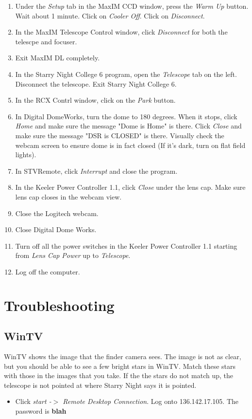 \documentclass[11pt]{report}
\begin{document}
\begin{enumerate}
\item Under the \emph{Setup} tab in the MaxIM CCD window, press the \emph{Warm Up} button. Wait about 1 minute. Click on \emph{Cooler Off}. Click on \emph{Disconnect}.
\item In the MaxIM Telescope Control window, click \emph{Disconnect} for both the telescpe and focuser.
\item Exit MaxIM DL completely.
\item In the Starry Night College 6 program, open the \emph{Telescope} tab on the left. Disconnect the telescope. Exit Starry Night College 6.
\item In the RCX Contrl window, click on the \emph{Park} button.
\item In Digital DomeWorks, turn the dome to 180 degrees. When it stops, click \emph{Home} and make sure the message "Dome is Home" is there. Click \emph{Close} and make sure the message "DSR is CLOSED" is there. Visually check the webcam screen to ensure dome is in fact closed (If it's dark, turn on flat field lights).
\item In STVRemote, click \emph{Interrupt} and close the program.
\item In the Keeler Power Controller 1.1, click \emph{Close} under the lens cap. Make sure lens cap closes in the webcam view.
\item Close the Logitech webcam.
\item Close Digital Dome Works.
\item Turn off all the power switches in the Keeler Power Controller 1.1 starting from \emph{Lens Cap Power} up to \emph{Telescope}.
\item Log off the computer.
\end{enumerate}

\chapter{Troubleshooting}

\section{WinTV}

WinTV shows the image that the finder camera sees. The image is not as clear, but you should be able to see a few bright stars in WinTV. Match these stars with those in the images that you take. If the the stars do not match up, the telescope is not pointed at where Starry Night says it is pointed.
\begin{itemize}
\item Click \emph{start -{$>$} Remote Desktop Connection}. Log onto 136.142.17.105. The password is {\bf blah}
\end{itemize}
\end{document}

